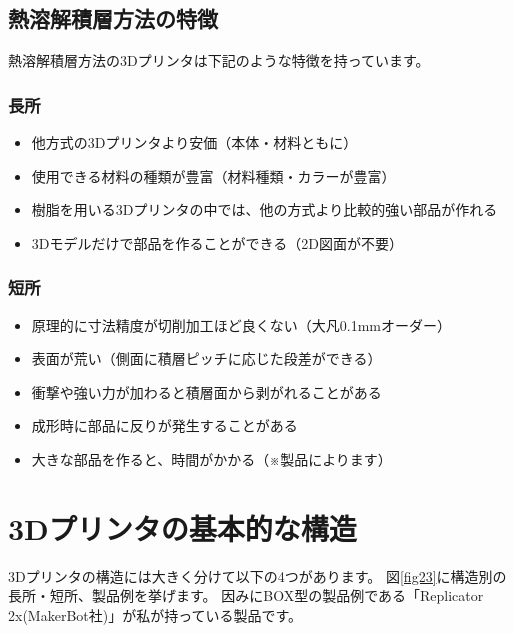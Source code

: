 \subsection{熱溶解積層方法の特徴}\label{ux71b1ux6eb6ux89e3ux7a4dux5c64ux65b9ux6cd5ux306eux7279ux5fb4}

熱溶解積層方法の3Dプリンタは下記のような特徴を持っています。

\subsubsection{長所}\label{ux9577ux6240}

\begin{itemize}
\tightlist
\item
  他方式の3Dプリンタより安価（本体・材料ともに）
\item
  使用できる材料の種類が豊富（材料種類・カラーが豊富）
\item
  樹脂を用いる3Dプリンタの中では、他の方式より比較的強い部品が作れる
\item
  3Dモデルだけで部品を作ることができる（2D図面が不要）
\end{itemize}

\subsubsection{短所}\label{ux77edux6240}

\begin{itemize}
\tightlist
\item
  原理的に寸法精度が切削加工ほど良くない（大凡0.1mmオーダー）
\item
  表面が荒い（側面に積層ピッチに応じた段差ができる）
\item
  衝撃や強い力が加わると積層面から剥がれることがある
\item
  成形時に部品に反りが発生することがある
\item
  大きな部品を作ると、時間がかかる（※製品によります）
\end{itemize}

\clearpage

\section{3Dプリンタの基本的な構造}\label{dux30d7ux30eaux30f3ux30bfux306eux57faux672cux7684ux306aux69cbux9020}

3Dプリンタの構造には大きく分けて以下の4つがあります。
図\ref{fig23}に構造別の長所・短所、製品例を挙げます。
因みにBOX型の製品例である「Replicator
2x(MakerBot社)」が私が持っている製品です。

